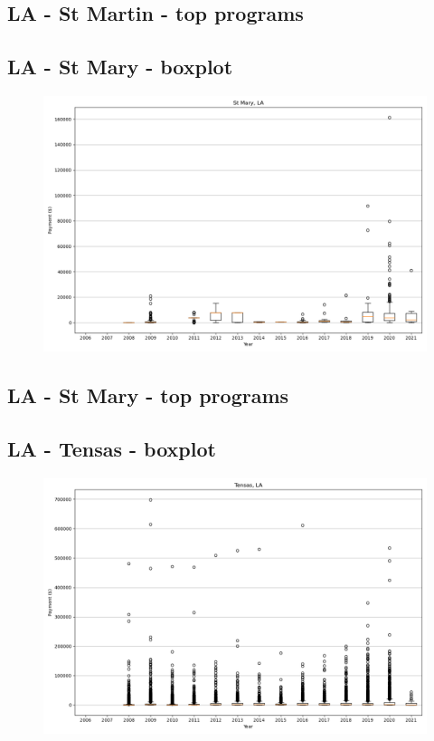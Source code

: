 \subsection*{LA - St Martin - top programs}

\newpage
\subsection*{LA - St Mary - boxplot}
\begin{figure}[h]
\centering
\includegraphics[width=7in]{../output/boxplots/counties/St Mary-LA_boxplot.png}
\end{figure}


\subsection*{LA - St Mary - top programs}

\newpage
\subsection*{LA - Tensas - boxplot}
\begin{figure}[h]
\centering
\includegraphics[width=7in]{../output/boxplots/counties/Tensas-LA_boxplot.png}
\end{figure}


